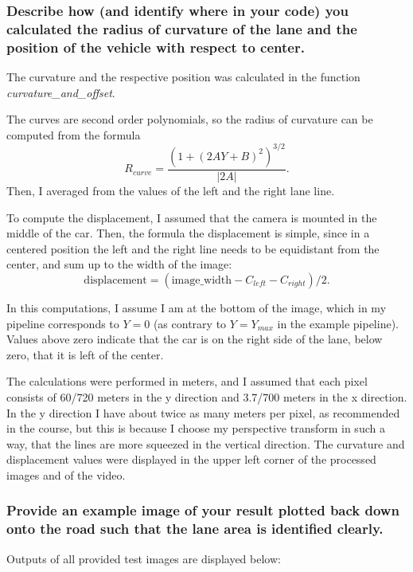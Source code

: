 \documentclass[a4paper,10pt]{article}
\begin{document}
\subsubsection{Describe how (and identify where in your code) you calculated the radius of curvature of the lane and the position of the vehicle with respect to center.}

The curvature and the respective position was calculated in the function \emph{curvature\_and\_offset}.

The curves are second order polynomials, so the radius of curvature can be computed from the formula 
%
$$
  R_{curve} = \frac{(1+(2AY+B)^2)^{3/2}}{|2A|}.
$$
%
Then, I averaged from the values of the left and the right lane line.


To compute the displacement, I assumed that the camera is mounted in the middle of the car.
Then, the formula the displacement is simple, since in a centered position the left and the right line needs to be equidistant from the center,
and sum up to the width of the image:
%
$$
 \text{displacement} = (\text{image\_width} - C_{left} - C_{right})/2.
$$

In this computations, I assume I am at the bottom of the image, which in my pipeline corresponds to $Y=0$
(as contrary to $Y=Y_{max}$ in the example pipeline).
Values above zero indicate that the car is on the right side of the lane, below zero, that it is left of the center.

The calculations were performed in meters, and I assumed that each pixel consists of 60/720 meters in the y direction and 3.7/700 meters in the x direction.
In the y direction I have about twice as many meters per pixel, as recommended in the course, but this is because I choose my perspective transform
in such a way, that the lines are more squeezed in the vertical direction.
The curvature and displacement values were displayed in the upper left corner of the processed images and of the video.



\subsubsection{ Provide an example image of your result plotted back down onto the road such that the lane area is identified clearly.}

Outputs of all provided test images are displayed below:
\end{document}
